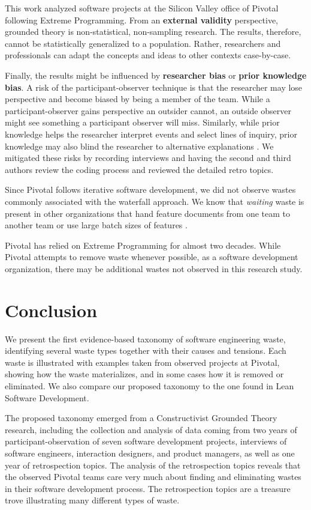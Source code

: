 This work analyzed software projects at the Silicon Valley office of Pivotal following Extreme Programming. From an \textbf{external validity} perspective, grounded theory is non-statistical, non-sampling research. The results, therefore, cannot be statistically generalized to a population. Rather, researchers and professionals can adapt the concepts and ideas to other contexts case-by-case.

Finally, the results might be influenced by \textbf{researcher bias} or \textbf{prior knowledge bias}. A risk of the participant-observer technique is that the researcher may lose perspective and become biased by being a member of the team. While a participant-observer gains perspective an outsider cannot, an outside observer might see something a participant observer will miss. Similarly, while prior knowledge helps the researcher interpret events and select lines of inquiry, prior knowledge may also blind the researcher to alternative explanations \cite{GlaserIssues}. We mitigated these risks by recording interviews and having the second and third authors review the coding process and reviewed the detailed retro topics.

Since Pivotal follows iterative software development, we did not observe wastes commonly associated with the waterfall approach. We know that \textit{waiting} waste is present in other organizations that hand feature documents from one team to another team or use large batch sizes of features \cite{Ali2016, Khurum2014, Mujtaba2010}.

Pivotal has relied on Extreme Programming for almost two decades. While Pivotal attempts to remove waste whenever possible, as a  software development organization, there may be additional wastes not observed in this research study. 
\section{Conclusion}
\label{Conclusion}
We present the first evidence-based taxonomy of software engineering waste, identifying several waste types together with their causes and tensions. Each waste is illustrated with examples taken from observed projects at Pivotal, showing how the waste materializes, and in some cases how it is removed or eliminated. We also compare our proposed taxonomy to the one found in Lean Software Development.

The proposed taxonomy emerged from a Constructivist Grounded Theory research, including the collection and analysis of data coming from two years of participant-observation of seven software development projects, interviews of \numberOfInterviews{} software engineers, interaction designers, and product managers, as well as one year of retrospection topics. The analysis of the retrospection topics reveals that the observed Pivotal teams care very much about finding and eliminating wastes in their software development process. The retrospection topics are a treasure trove illustrating many different types of waste. 

